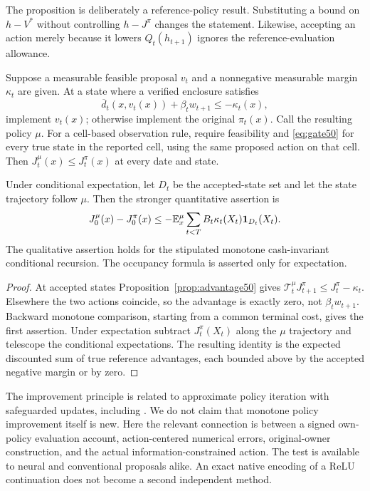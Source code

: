 The proposition is deliberately a reference-policy result. Substituting a bound on $h-V^*$ without controlling $h-J^\pi$ changes the statement. Likewise, accepting an action merely because it lowers $Q_t(h_{t+1})$ ignores the reference-evaluation allowance.

\begin{theorem}\label{thm:improve50}
Suppose a measurable feasible proposal $v_t$ and a nonnegative measurable margin $\kappa_t$ are given. At a state where a verified enclosure satisfies
\begin{equation}\label{eq:gate50}
 \overline d_t(x,v_t(x))+\beta_tw_{t+1}\le-\kappa_t(x),
\end{equation}
implement $v_t(x)$; otherwise implement the original $\pi_t(x)$. Call the resulting policy $\mu$. For a cell-based observation rule, require feasibility and \eqref{eq:gate50} for every true state in the reported cell, using the same proposed action on that cell. Then $J_t^\mu(x)\le J_t^\pi(x)$ at every date and state.

Under conditional expectation, let $D_t$ be the accepted-state set and let the state trajectory follow $\mu$. Then the stronger quantitative assertion is
\begin{equation}\label{eq:occupancy50}
 J_0^\mu(x)-J_0^\pi(x)
 \le-\mathbb E_x^\mu\sum_{t<T}B_t\kappa_t(X_t)\mathbf1_{D_t}(X_t).
\end{equation}
The qualitative assertion holds for the stipulated monotone cash-invariant conditional recursion. The occupancy formula is asserted only for expectation.
\end{theorem}
\begin{proof}
At accepted states Proposition~\ref{prop:advantage50} gives $\mathcal T_t^\mu J_{t+1}^\pi\le J_t^\pi-\kappa_t$. Elsewhere the two actions coincide, so the advantage is exactly zero, not $\beta_tw_{t+1}$. Backward monotone comparison, starting from a common terminal cost, gives the first assertion. Under expectation subtract $J_t^\pi(X_t)$ along the $\mu$ trajectory and telescope the conditional expectations. The resulting identity is the expected discounted sum of true reference advantages, each bounded above by the accepted negative margin or by zero.\end{proof}

The improvement principle is related to approximate policy iteration with safeguarded updates, including \citet{metelli2021}. We do not claim that monotone policy improvement itself is new. Here the relevant connection is between a signed own-policy evaluation account, action-centered numerical errors, original-owner construction, and the actual information-constrained action. The test is available to neural and conventional proposals alike. An exact native encoding of a ReLU continuation does not become a second independent method.

